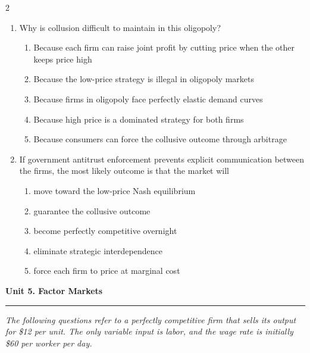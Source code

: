 \documentclass[10pt]{article}
\newenvironment{choiceslist}
  {\begin{enumerate}[label=(\Alph*), leftmargin=1.6em, itemsep=0.12em, topsep=0.18em, parsep=0pt]}
  {\end{enumerate}}
\newenvironment{stimulus}
  {\begin{center}\begin{minipage}{0.96\columnwidth}\footnotesize\itshape\setlength{\tabcolsep}{3pt}\renewcommand{\arraystretch}{0.96}}
  {\end{minipage}\end{center}}
\newcommand{\unitheader}[2]{%
  \vspace{0.35em}
  {\large\bfseries Unit #1. #2\par}
  \vspace{0.2em}
  \hrule
  \vspace{0.45em}
}
\begin{document}
\begin{multicols*}{2}
\begin{enumerate}[resume*=apq, leftmargin=*, itemsep=0.85em, topsep=0.2em, parsep=0pt]
\begin{choiceslist}
\end{choiceslist}
\item Why is collusion difficult to maintain in this oligopoly?
\begin{choiceslist}
\item Because each firm can raise joint profit by cutting price when the other keeps price high
\item Because the low-price strategy is illegal in oligopoly markets
\item Because firms in oligopoly face perfectly elastic demand curves
\item Because high price is a dominated strategy for both firms
\item Because consumers can force the collusive outcome through arbitrage
\end{choiceslist}
\item If government antitrust enforcement prevents explicit communication between the firms, the most likely outcome is that the market will
\begin{choiceslist}
\item move toward the low-price Nash equilibrium
\item guarantee the collusive outcome
\item become perfectly competitive overnight
\item eliminate strategic interdependence
\item force each firm to price at marginal cost
\end{choiceslist}
\end{enumerate}
\unitheader{5}{Factor Markets}
\begin{stimulus}
The following questions refer to a perfectly competitive firm that sells its output for \$12 per unit. The only variable input is labor, and the wage rate is initially \$60 per worker per day.


\end{stimulus}
\end{multicols*}
\end{document}
